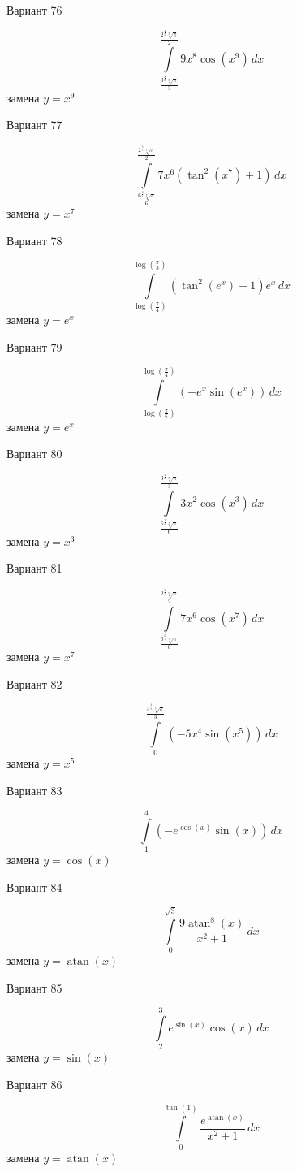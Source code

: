 \documentclass[11pt]{report}
\begin{document}
Вариант 76

$$\int\limits_{\frac{3^{\frac{8}{9}} \sqrt[9]{\pi}}{3}}^{\frac{2^{\frac{8}{9}} \sqrt[9]{\pi}}{2}} 9 x^{8} \cos{\left(x^{9} \right)}\, dx$$
замена $y = x^{9}$

Вариант 77

$$\int\limits_{\frac{6^{\frac{6}{7}} \sqrt[7]{\pi}}{6}}^{\frac{2^{\frac{5}{7}} \sqrt[7]{\pi}}{2}} 7 x^{6} \left(\tan^{2}{\left(x^{7} \right)} + 1\right)\, dx$$
замена $y = x^{7}$

Вариант 78

$$\int\limits_{\log{\left(\frac{\pi}{4} \right)}}^{\log{\left(\frac{\pi}{3} \right)}} \left(\tan^{2}{\left(e^{x} \right)} + 1\right) e^{x}\, dx$$
замена $y = e^{x}$

Вариант 79

$$\int\limits_{\log{\left(\frac{\pi}{6} \right)}}^{\log{\left(\frac{\pi}{4} \right)}} \left(- e^{x} \sin{\left(e^{x} \right)}\right)\, dx$$
замена $y = e^{x}$

Вариант 80

$$\int\limits_{\frac{6^{\frac{2}{3}} \sqrt[3]{\pi}}{6}}^{\frac{3^{\frac{2}{3}} \sqrt[3]{\pi}}{3}} 3 x^{2} \cos{\left(x^{3} \right)}\, dx$$
замена $y = x^{3}$

Вариант 81

$$\int\limits_{\frac{6^{\frac{6}{7}} \sqrt[7]{\pi}}{6}}^{\frac{2^{\frac{5}{7}} \sqrt[7]{\pi}}{2}} 7 x^{6} \cos{\left(x^{7} \right)}\, dx$$
замена $y = x^{7}$

Вариант 82

$$\int\limits_{0}^{\frac{3^{\frac{4}{5}} \sqrt[5]{\pi}}{3}} \left(- 5 x^{4} \sin{\left(x^{5} \right)}\right)\, dx$$
замена $y = x^{5}$

Вариант 83

$$\int\limits_{1}^{4} \left(- e^{\cos{\left(x \right)}} \sin{\left(x \right)}\right)\, dx$$
замена $y = \cos{\left(x \right)}$

Вариант 84

$$\int\limits_{0}^{\sqrt{3}} \frac{9 \operatorname{atan}^{8}{\left(x \right)}}{x^{2} + 1}\, dx$$
замена $y = \operatorname{atan}{\left(x \right)}$

Вариант 85

$$\int\limits_{2}^{3} e^{\sin{\left(x \right)}} \cos{\left(x \right)}\, dx$$
замена $y = \sin{\left(x \right)}$

Вариант 86

$$\int\limits_{0}^{\tan{\left(1 \right)}} \frac{e^{\operatorname{atan}{\left(x \right)}}}{x^{2} + 1}\, dx$$
замена $y = \operatorname{atan}{\left(x \right)}$
\end{document}
